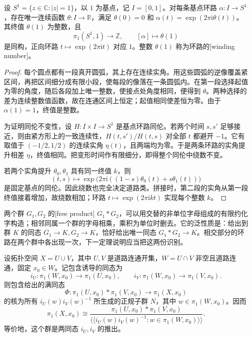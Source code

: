 \begin{proposition}\label{g2:prop:circle-fundamental-group}
	设 \(S^1=\{z\in\mathbb C:|z|=1\}\)，以 \(1\) 为基点，记 \(I=[0,1]\)。对每条基点环路 \(\alpha:I\rightarrow S^1\)，存在唯一连续函数 \(\theta:I\rightarrow\mathbb R\)，满足 \(\theta(0)=0\) 和 \(\alpha(t)=\exp(2\pi\mathrm{i}\theta(t))\)。其终值 \(\theta(1)\) 为整数，且
	\[
		\pi_1(S^1,1)\longrightarrow\mathbb Z,\qquad[\alpha]\longmapsto\theta(1)
	\]
	是同构，正向环路 \(t\mapsto\exp(2\pi\mathrm{i}t)\) 对应 \(1\)。整数 \(\theta(1)\) 称为环路的[winding number]。
\end{proposition}
\begin{proof}
	每个圆点都有一段真开圆弧，其上存在连续实角。用这些圆弧的逆像覆盖紧区间，再把区间细分成有限小段，使每段的像落在一条圆弧内。在第一段选择起值为零的角度，随后各段加上唯一整数，使接点处角度相同，便得到 \(\theta\)。两种选择的差为连续整数值函数，故在连通区间上恒定；起值相同使差恒为零。由于 \(\alpha(1)=1\)，终值是整数。

	为证明同伦不变性，设 \(H:I\times I\rightarrow S^1\) 是基点环路同伦。若两个时间 \(s,s'\) 足够接近，则由紧方形上的一致连续性，\(H(t,s')/H(t,s)\) 对全部 \(t\) 都避开 \(-1\)。它有取值于 \((-1/2,1/2)\) 的连续实角 \(\eta(t)\)，且两端均为零。于是两条环路的实角提升相差 \(\eta\)，终值相同。把变形时间作有限细分，即得整个同伦中绕数不变。

	若两个实角提升 \(\theta_0,\theta_1\) 具有同一终值 \(k\)，则
	\[
		(t,s)\longmapsto\exp\bigl(2\pi\mathrm{i}((1-s)\theta_0(t)+s\theta_1(t))\bigr)
	\]
	是固定基点的同伦。因此绕数也完全决定道路类。拼接时，第二段的实角从第一段终值接着增加，故绕数相加；环路 \(t\mapsto\exp(2\pi\mathrm{i}kt)\) 实现每个整数 \(k\)。
\end{proof}

两个群 \(G_1,G_2\) 的[free product] \(G_1*G_2\)，可以用交替的非单位字母组成的有限约化字构造；相邻同属一个群的字母相乘，乘积为单位时删去。它的泛性质是：给出到群 \(K\) 的同态 \(G_1\rightarrow K,G_2\rightarrow K\)，恰好给出唯一同态 \(G_1*G_2\rightarrow K\)。相交部分的环路在两个群中各出现一次，下一定理说明应当把这两份识别。

\begin{theorem}\label{g2:thm:van-kampen}
	设拓扑空间 \(X=U\cup V\)，其中 \(U,V\) 是道路连通开集，\(W=U\cap V\) 非空且道路连通，固定 \(x_0\in W\)。记包含诱导的同态为
	\[
		i_U:\pi_1(W,x_0)\longrightarrow\pi_1(U,x_0),\qquad
		i_V:\pi_1(W,x_0)\longrightarrow\pi_1(V,x_0).
	\]
	则包含给出的满同态
	\[
		\Phi:\pi_1(U,x_0)*\pi_1(V,x_0)\longrightarrow\pi_1(X,x_0)
	\]
	的核为所有 \(i_U(w)i_V(w)^{-1}\) 所生成的正规子群 \(N\)，其中 \(w\in\pi_1(W,x_0)\)。因而
	\[
		\pi_1(X,x_0)\cong
		\frac{\pi_1(U,x_0)*\pi_1(V,x_0)}{\langle\!\langle i_U(w)i_V(w)^{-1}:w\in\pi_1(W,x_0)\rangle\!\rangle}.
	\]
	等价地，这个群是两同态 \(i_U,i_V\) 的推出。
\end{theorem}

